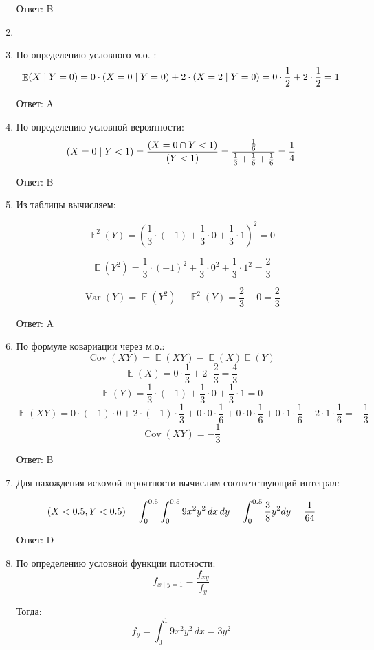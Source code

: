 \documentclass[a4paper]{article} %
\DeclareMathOperator{\Var}{Var}
\DeclareMathOperator{\Cov}{Cov}
\DeclareMathOperator{\E}{\mathbb{E}}
\let\P\relax
\DeclareMathOperator{\P}{\mathbb{P}}
\begin{document}
\begin{enumerate}
    Ответ: B

    \item

    
    \item
    По определению условного м.о. :
    \[\E(X \mid Y=0) = 0 \cdot \P(X=0 \mid Y=0) + 2 \cdot \P(X=2 \mid Y=0) = 0 \cdot \frac{1}{2} + 2 \cdot \frac{1}{2} = 1\]
    
    Ответ: A
    
    \item
    По определению условной вероятности:
    \[\P(X=0 \mid Y<1) = \frac{\P(X=0 \cap Y<1)}{\P(Y<1)} = \frac{\frac{1}{6}}{\frac{1}{3}+\frac{1}{6}+\frac{1}{6}} = \frac{1}{4}\]
    
    Ответ: B

    \item
    Из таблицы вычисляем:

    \[\E^2(Y) = (\frac{1}{3} \cdot (-1) + \frac{1}{3} \cdot 0 + \frac{1}{3} \cdot 1)^2 = 0\]

    \[\E(Y^2) = \frac{1}{3} \cdot (-1)^2 + \frac{1}{3} \cdot 0^2 + \frac{1}{3} \cdot 1^2 = \frac{2}{3}\]

    \[\Var(Y) = \E(Y^2) - \E^2(Y) = \frac{2}{3} - 0 = \frac{2}{3}\]
    
    Ответ: A
    
    \item
    По формуле ковариации через м.о.:
    \[\Cov(XY) = \E(XY) - \E(X)\E(Y)\]
    \[\E(X) = 0\cdot\frac{1}{3} + 2\cdot\frac{2}{3} = \frac{4}{3}\]
    \[\E(Y) = \frac{1}{3} \cdot (-1) + \frac{1}{3} \cdot 0 + \frac{1}{3} \cdot 1 = 0\]
    \[\E(XY) = 0\cdot(-1)\cdot0 + 2\cdot(-1)\cdot\frac{1}{3} + 0\cdot0\cdot\frac{1}{6} + 0\cdot0\cdot\frac{1}{6} + 0\cdot1\cdot\frac{1}{6} + 2\cdot1\cdot\frac{1}{6} = -\frac{1}{3}\]
    \[\Cov(XY) = -\frac{1}{3}\]
    
    Ответ: B

    \item
    Для нахождения искомой вероятности вычислим соответствующий интеграл:
    
    \[\P(X<0.5, Y<0.5) = \int_{0}^{0.5}\int_{0}^{0.5} 9x^2y^2 \,dx\,dy = \int_{0}^{0.5} \frac{3}{8}y^2 dy = \frac{1}{64}\]
    
    Ответ: D
    
    \item
    По определению условной функции плотности:
    \[f_{x\mid y=1} = \frac{f_{xy}}{f_{y}}\]
    
    Тогда:
    \[f_{y} = \int_{0}^{1} 9x^2y^2 \,dx = 3y^2\]
    

\end{enumerate}
\end{document}
